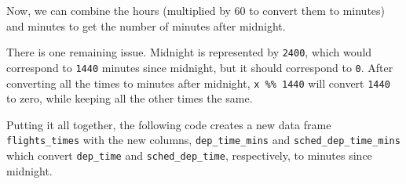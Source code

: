 \documentclass[]{book}
\newenvironment{Shaded}{\begin{snugshade}}{\end{snugshade}}
\newcommand{\CommentTok}[1]{\textcolor[rgb]{0.56,0.35,0.01}{\textit{#1}}}
\newcommand{\DataTypeTok}[1]{\textcolor[rgb]{0.13,0.29,0.53}{#1}}
\newcommand{\DecValTok}[1]{\textcolor[rgb]{0.00,0.00,0.81}{#1}}
\newcommand{\KeywordTok}[1]{\textcolor[rgb]{0.13,0.29,0.53}{\textbf{#1}}}
\newcommand{\NormalTok}[1]{#1}
\newcommand{\OperatorTok}[1]{\textcolor[rgb]{0.81,0.36,0.00}{\textbf{#1}}}
\newcommand{\StringTok}[1]{\textcolor[rgb]{0.31,0.60,0.02}{#1}}
\theoremstyle{plain}
\theoremstyle{remark}
\begin{document}
Now, we can combine the hours (multiplied by 60 to convert them to
minutes) and minutes to get the number of minutes after midnight.

\begin{Shaded}
\end{Shaded}

There is one remaining issue. Midnight is represented by \texttt{2400},
which would correspond to \texttt{1440} minutes since midnight, but it
should correspond to \texttt{0}. After converting all the times to
minutes after midnight, \texttt{x\ \%\%\ 1440} will convert
\texttt{1440} to zero, while keeping all the other times the same.

Putting it all together, the following code creates a new data frame
\texttt{flights\_times} with the new columns, \texttt{dep\_time\_mins}
and \texttt{sched\_dep\_time\_mins} which convert \texttt{dep\_time} and
\texttt{sched\_dep\_time}, respectively, to minutes since midnight.

\begin{Shaded}
\end{Shaded}
\end{document}
